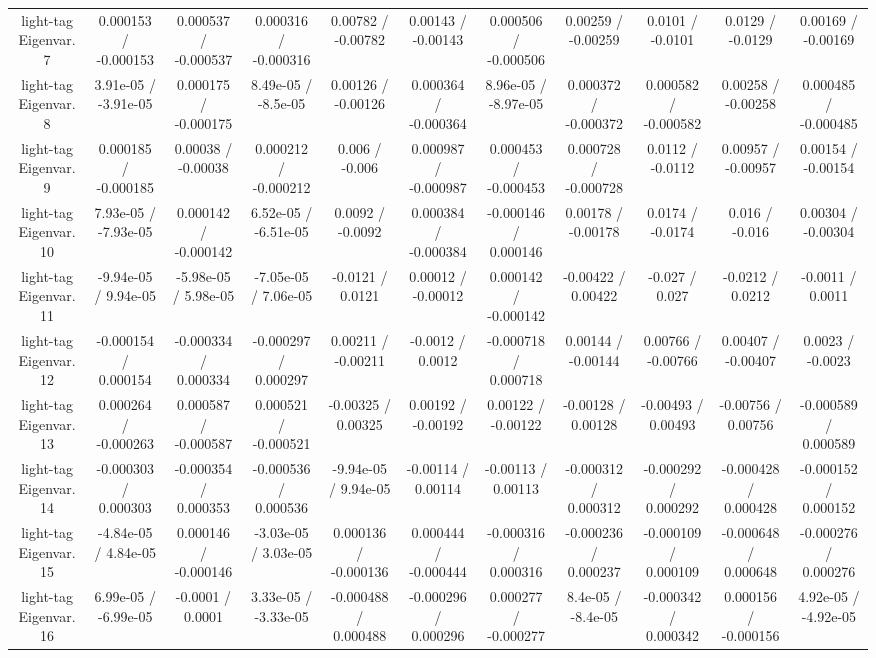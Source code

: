 \begin{table}[htbp]
\begin{center}
\begin{tabular}{|c|c|c|c|c|c|c|c|c|c|c|}
  light-tag Eigenvar. 7 & 0.000153 / -0.000153 & 0.000537 / -0.000537 & 0.000316 / -0.000316 & 0.00782 / -0.00782 & 0.00143 / -0.00143 & 0.000506 / -0.000506 & 0.00259 / -0.00259 & 0.0101 / -0.0101 & 0.0129 / -0.0129 & 0.00169 / -0.00169 \\ 
  light-tag Eigenvar. 8 & 3.91e-05 / -3.91e-05 & 0.000175 / -0.000175 & 8.49e-05 / -8.5e-05 & 0.00126 / -0.00126 & 0.000364 / -0.000364 & 8.96e-05 / -8.97e-05 & 0.000372 / -0.000372 & 0.000582 / -0.000582 & 0.00258 / -0.00258 & 0.000485 / -0.000485 \\ 
  light-tag Eigenvar. 9 & 0.000185 / -0.000185 & 0.00038 / -0.00038 & 0.000212 / -0.000212 & 0.006 / -0.006 & 0.000987 / -0.000987 & 0.000453 / -0.000453 & 0.000728 / -0.000728 & 0.0112 / -0.0112 & 0.00957 / -0.00957 & 0.00154 / -0.00154 \\ 
  light-tag Eigenvar. 10 & 7.93e-05 / -7.93e-05 & 0.000142 / -0.000142 & 6.52e-05 / -6.51e-05 & 0.0092 / -0.0092 & 0.000384 / -0.000384 & -0.000146 / 0.000146 & 0.00178 / -0.00178 & 0.0174 / -0.0174 & 0.016 / -0.016 & 0.00304 / -0.00304 \\ 
  light-tag Eigenvar. 11 & -9.94e-05 / 9.94e-05 & -5.98e-05 / 5.98e-05 & -7.05e-05 / 7.06e-05 & -0.0121 / 0.0121 & 0.00012 / -0.00012 & 0.000142 / -0.000142 & -0.00422 / 0.00422 & -0.027 / 0.027 & -0.0212 / 0.0212 & -0.0011 / 0.0011 \\ 
  light-tag Eigenvar. 12 & -0.000154 / 0.000154 & -0.000334 / 0.000334 & -0.000297 / 0.000297 & 0.00211 / -0.00211 & -0.0012 / 0.0012 & -0.000718 / 0.000718 & 0.00144 / -0.00144 & 0.00766 / -0.00766 & 0.00407 / -0.00407 & 0.0023 / -0.0023 \\ 
  light-tag Eigenvar. 13 & 0.000264 / -0.000263 & 0.000587 / -0.000587 & 0.000521 / -0.000521 & -0.00325 / 0.00325 & 0.00192 / -0.00192 & 0.00122 / -0.00122 & -0.00128 / 0.00128 & -0.00493 / 0.00493 & -0.00756 / 0.00756 & -0.000589 / 0.000589 \\ 
  light-tag Eigenvar. 14 & -0.000303 / 0.000303 & -0.000354 / 0.000353 & -0.000536 / 0.000536 & -9.94e-05 / 9.94e-05 & -0.00114 / 0.00114 & -0.00113 / 0.00113 & -0.000312 / 0.000312 & -0.000292 / 0.000292 & -0.000428 / 0.000428 & -0.000152 / 0.000152 \\ 
  light-tag Eigenvar. 15 & -4.84e-05 / 4.84e-05 & 0.000146 / -0.000146 & -3.03e-05 / 3.03e-05 & 0.000136 / -0.000136 & 0.000444 / -0.000444 & -0.000316 / 0.000316 & -0.000236 / 0.000237 & -0.000109 / 0.000109 & -0.000648 / 0.000648 & -0.000276 / 0.000276 \\ 
  light-tag Eigenvar. 16 & 6.99e-05 / -6.99e-05 & -0.0001 / 0.0001 & 3.33e-05 / -3.33e-05 & -0.000488 / 0.000488 & -0.000296 / 0.000296 & 0.000277 / -0.000277 & 8.4e-05 / -8.4e-05 & -0.000342 / 0.000342 & 0.000156 / -0.000156 & 4.92e-05 / -4.92e-05 \\ 

\end{tabular}
\end{center}
\end{table}
